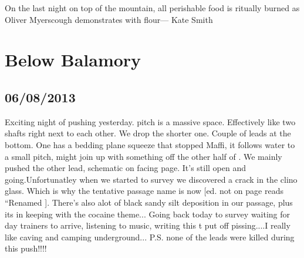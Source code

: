 




\begin{marginfigure}
\centering
{}
\label{Olifire}
\caption{On the last night on top of the mountain, all perishable food is ritually burned as Oliver Myerscough demonstrates with flour--- Kate Smith}
\end{marginfigure}

\section{Below Balamory}

    
\subsection{06/08/2013}
Exciting night of pushing yesterday.  pitch is a massive space. Effectively like two shafts right next to each other. We drop the shorter one. Couple of leads at the bottom. One has a bedding plane squeeze that stopped Maffi, it follows water to a small pitch, might join up with something off the other half of .
We mainly pushed the other lead, schematic on facing page. It’s still open and going.Unfortunatley when we started to survey we discovered a crack in the clino glass. Which is why the tentative passage name is now  [ed. not on page reads “Renamed ]. There’s also alot of black sandy silt deposition in our passage, plus its in keeping with the cocaine theme...
Going back today to survey waiting for day trainers to arrive, listening to music, writing this t put off pissing....I really like caving and camping underground...
P.S. none of the leads were killed during this push!!!!

